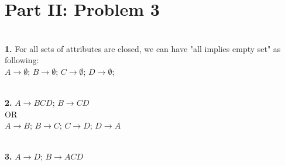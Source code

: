 \documentclass[letterpaper,11pt]{article}
\newcommand{\Paragraph}[1]{~\vspace*{-0.7\baselineskip}\\{\bf #1}}
\begin{document}
\section*{Part II: Problem 3}
\Paragraph{1.}
For all sets of attributes are closed, we can have "all implies empty set" as following: \\
\(A \rightarrow \emptyset\); \(B \rightarrow \emptyset\); \(C \rightarrow \emptyset\); \(D \rightarrow \emptyset\); 

\Paragraph{2.}
\(A \rightarrow BCD\); \(B \rightarrow CD\) \\
OR\\
\(A \rightarrow B\); \(B \rightarrow C\); \(C \rightarrow D\); \(D \rightarrow A\)

\Paragraph{3.}
\(A \rightarrow D\); \(B \rightarrow ACD\)\\
\end{document}
